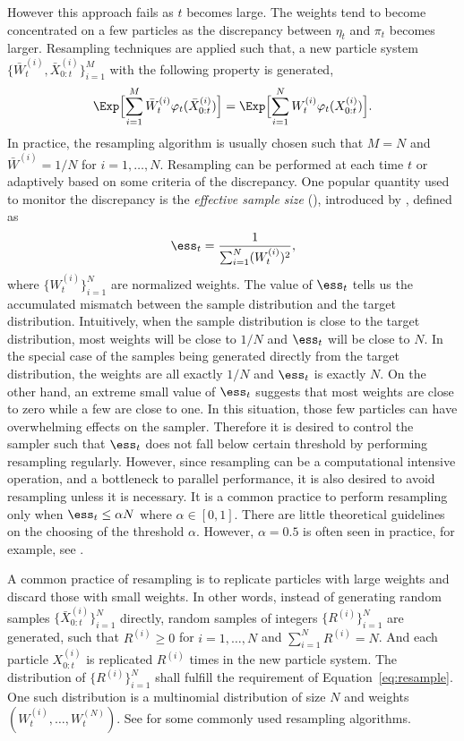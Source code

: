 \documentclass[11pt, fontset=Minion, showoverfull,
bib, mintcode, minted=cache]{marticle}
\begin{document}
However this approach fails as $t$ becomes large. The weights tend to become
concentrated on a few particles as the discrepancy between $\eta_t$ and
$\pi_t$ becomes larger. Resampling techniques are applied such that, a new
particle system $\{\bar{W}_t^{(i)},\bar{X}_{0:t}^{(i)}\}_{i=1}^M$ with the
following property is generated,
\begin{equation}
  \Exp\Bigl[\sum_{i=1}^M\bar{W}_t^{(i)}\varphi_t(\bar{X}_{0:t}^{(i)})\Bigr] =
  \Exp\Bigl[\sum_{i=1}^NW_t^{(i)}\varphi_t(X_{0:t}^{(i)})\Bigr].
  \label{eq:resample}
\end{equation}
In practice, the resampling algorithm is usually chosen such that $M = N$ and
$\bar{W}^{(i)} = 1/N$ for $i=1,\dots,N$. Resampling can be performed at each
time $t$ or adaptively based on some criteria of the discrepancy. One popular
quantity used to monitor the discrepancy is the \emph{effective sample size}
(\ess), introduced by \textcite{Liu:1998iu}, defined as
\begin{equation}
  \ess_t = \frac{1}{\sum_{i=1}^N (W_t^{(i)})^2},
\end{equation}
where $\{W_t^{(i)}\}_{i=1}^N$ are normalized weights. The value of $\ess_t$
tells us the accumulated mismatch between the sample distribution and the
target distribution. Intuitively, when the sample distribution is close to the
target distribution, most weights will be close to $1/N$ and $\ess_t$ will be
close to $N$. In the special case of the samples being generated directly from
the target distribution, the weights are all exactly $1/N$ and $\ess_t$ is
exactly $N$. On the other hand, an extreme small value of $\ess_t$ suggests
that most weights are close to zero while a few are close to one. In this
situation, those few particles can have overwhelming effects on the sampler.
Therefore it is desired to control the sampler such that $\ess_t$ does not
fall below certain threshold by performing resampling regularly. However,
since resampling can be a computational intensive operation, and a bottleneck
to parallel performance, it is also desired to avoid resampling unless it is
necessary. It is a common practice to perform resampling only when $\ess_t\le
\alpha N$ where $\alpha\in[0,1]$. There are little theoretical guidelines on
the choosing of the threshold $\alpha$. However, $\alpha = 0.5$ is often seen
in practice, for example, see \textcite{Jasra:2010eh}.

A common practice of resampling is to replicate particles with large weights
and discard those with small weights. In other words, instead of generating
random samples $\{\bar{X}_{0:t}^{(i)}\}_{i=1}^N$ directly, random samples of
integers $\{R^{(i)}\}_{i=1}^N$ are generated, such that $R^{(i)} \ge 0$ for $i
= 1,\dots,N$ and $\sum_{i=1}^N R^{(i)} = N$. And each particle $X_{0:t}^{(i)}$
is replicated $R^{(i)}$ times in the new particle system. The distribution of
$\{R^{(i)}\}_{i=1}^N$ shall fulfill the requirement of
Equation~\ref{eq:resample}. One such distribution is a multinomial
distribution of size $N$ and weights $(W_t^{(i)},\dots,W_t^{(N)})$. See
\textcite{Douc:2005wa} for some commonly used resampling algorithms.
\end{document}
